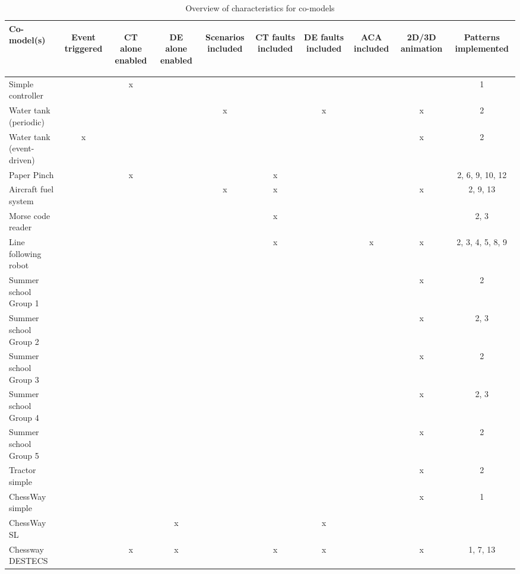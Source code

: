 \documentclass{crescendorepchap}
\begin{document}
\begin{table}[!h]
\begin{centering}
\begin{tabular}{|l|c|c|c|c|c|c|c|c|c|}\hline
Co-model(s)
&\begin{sideways}Event triggered\end{sideways}
&\begin{sideways}CT alone enabled\end{sideways}
&\begin{sideways}DE alone enabled\end{sideways}
&\begin{sideways}Scenarios included\end{sideways}
&\begin{sideways}CT faults included\end{sideways}
&\begin{sideways}DE faults included\end{sideways}
&\begin{sideways}ACA included\end{sideways}
&\begin{sideways}2D/3D animation\end{sideways}
&\begin{sideways}Patterns implemented\end{sideways} \\
\hline
Simple controller       & &x& & & & & & & 1\\ \hline
Water tank (periodic)  	 & & & &x& &x& &x &2 \\ \hline
Water tank (event-driven)&x& & & & & & &x &2 \\ \hline
Paper Pinch              & &x & & &x& & & &2, 6, 9, 10, 12\\ \hline
Aircraft fuel system     & & & &x&x& & &x & 2, 9, 13\\ \hline
Morse code reader        & & & & &x& & & &2, 3 \\ \hline
Line following robot     & & & & &x& &x&x &2, 3, 4, 5, 8, 9\\ \hline
Summer school Group 1    & & & & & & & &x &2\\ \hline
Summer school Group 2    & & & & & & & &x &2, 3\\ \hline
Summer school Group 3    & & & & & & & &x &2 \\ \hline
Summer school Group 4    & & & & & & & &x &2, 3 \\ \hline
Summer school Group 5    & & & & & & & &x &2 \\ \hline
Tractor simple           & & & & & & & &x&2 \\ \hline
ChessWay simple          & & & & & & & &x &1\\ \hline
ChessWay SL              & & &x & & &x & & & \\ \hline
Chessway DESTECS         & &x &x& &x&x& &x &1, 7, 13 \\ \hline
\end{tabular}
\caption{Overview of characteristics for co-models\label{tab:characteristics}}
\end{centering}
\end{table}
\end{document}
